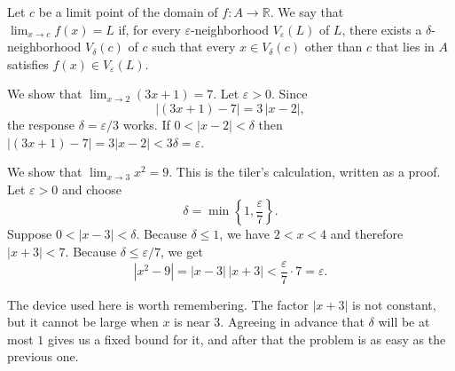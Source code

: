\begin{definition}
Let $c$ be a limit point of the domain of $f : A \to \mathbb{R}$.  We say that $\lim_{x \to c} f(x) = L$ if, for every $\varepsilon$-neighborhood $V_{\varepsilon}(L)$ of $L$, there exists a $\delta$-neighborhood $V_{\delta}(c)$ of $c$ such that every $x \in V_{\delta}(c)$ other than $c$ that lies in $A$ satisfies $f(x) \in V_{\varepsilon}(L)$.
\end{definition}

\begin{marginfigure}
\centering
{}
\caption{The limit of $f$ at $c$ is $L$.  Over the red band, the graph stays inside the blue band.  The value of $f$ at $c$ itself, shown by the solid dot, plays no part.}
\end{marginfigure}

\begin{example}
We show that $\lim_{x \to 2} (3x + 1) = 7$.  Let $\varepsilon > 0$.  Since
\[ |(3x + 1) - 7| = 3\,|x - 2|, \]
the response $\delta = \varepsilon/3$ works.  If $0 < |x - 2| < \delta$ then $|(3x+1) - 7| = 3|x - 2| < 3\delta = \varepsilon$.
\end{example}

\begin{example}\label{ex:tile-limit}
We show that $\lim_{x \to 3} x^2 = 9$.  This is the tiler's calculation, written as a proof.  Let $\varepsilon > 0$ and choose
\[ \delta = \min\left\{1, \frac{\varepsilon}{7}\right\}. \]
Suppose $0 < |x - 3| < \delta$.  Because $\delta \leq 1$, we have $2 < x < 4$ and therefore $|x + 3| < 7$.  Because $\delta \leq \varepsilon/7$, we get
\[ |x^2 - 9| = |x - 3|\,|x + 3| < \frac{\varepsilon}{7} \cdot 7 = \varepsilon. \]
\end{example}

The device used here is worth remembering.  The factor $|x + 3|$ is not constant, but it cannot be large when $x$ is near $3$.  Agreeing in advance that $\delta$ will be at most $1$ gives us a fixed bound for it, and after that the problem is as easy as the previous one.

